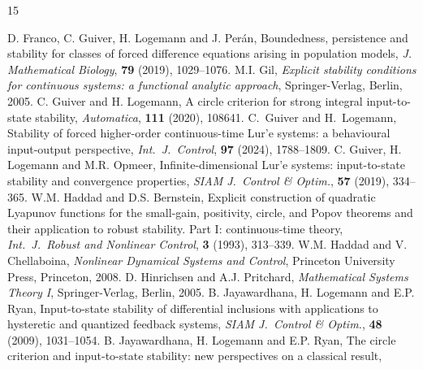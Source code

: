 \documentclass[a4paper,11pt]{article}
\numberwithin{equation}{section}
\numberwithin{figure}{section}
\numberwithin{table}{section}
\begin{document}
\begin{thebibliography}{15}
\begin{small}
%
\vspace{-2mm}
D. Franco, C. Guiver, H. Logemann and J. Per{\'a}n, Boundedness, persistence and stability for classes of forced difference equations arising in population models, {\it J. Mathematical Biology}, {\bf 79} (2019), 1029--1076.
%
\vspace{-2mm}
 M.I. Gil, {\it Explicit stability conditions for continuous systems: a functional analytic approach}, Springer-Verlag, Berlin, 2005.
%
%
\vspace{-2mm}
 C. Guiver and H. Logemann, A circle criterion for strong integral input-to-state stability, {\it Automatica}, {\bf 111} (2020), 108641.
%
\vspace{-2mm}
C.\ Guiver and H.\ Logemann, Stability of forced higher-order continuous-time Lur'e systems: a behavioural input-output perspective, {\it Int.\ J.\ Control}, {\bfseries 97} (2024), 1788--1809.
%
\vspace{-2mm}
C. Guiver, H. Logemann and M.R. Opmeer, Infinite-dimensional Lur'e systems: input-to-state stability and convergence properties, {\it SIAM J.\ Control \& Optim.}, {\bf 57} (2019), 334--365.
%
\vspace{-2mm}
 W.M. Haddad and D.S. Bernstein, Explicit construction of quadratic Lyapunov functions for the small-gain, positivity, circle, and Popov theorems and their application
    to robust stability. Part I: continuous-time theory, {\it Int.\ J.\ Robust and Nonlinear
    Control}, {\bf 3} (1993), 313--339.
%
\vspace{-2mm}
 W.M. Haddad and V. Chellaboina, {\it Nonlinear Dynamical Systems and Control},
Princeton University Press, Princeton, 2008.
%
\vspace{-2mm}
D. Hinrichsen and A.J. Pritchard, {\it Mathematical Systems Theory I}, Springer-Verlag, Berlin, 2005.
%
\vspace{-2mm}
 B. Jayawardhana, H. Logemann and E.P. Ryan,  Input-to-state stability of differential inclusions with applications to hysteretic and quantized feedback systems, {\it SIAM J.\ Control \& Optim.}, {\bf 48} (2009), 1031--1054.
%
\vspace{-2mm}
 B. Jayawardhana, H. Logemann and E.P. Ryan, The circle criterion and input-to-state stability: new perspectives on a classical result,

\end{small}
\end{thebibliography}
\end{document}
